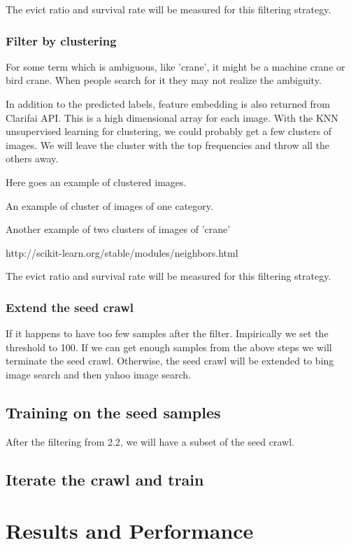 \documentclass[paper=a4, fontsize=11pt]{scrartcl}
\numberwithin{equation}{section}		%
\numberwithin{figure}{section}			%
\numberwithin{table}{section}				%
\begin{document}
\begin{multicols}{2}
The evict ratio and survival rate will be measured for this filtering strategy.

\subsubsection{Filter by clustering}
For some term which is ambiguous, like 'crane', it might be a machine crane or bird crane. When people search for it they may not realize the ambiguity.

In addition to the predicted labels, feature embedding is also returned from Clarifai API. This is a high dimensional array for each image. With the KNN unsupervised learning for clustering, we could probably get a few clusters of images. We will leave the cluster with the top frequencies and throw all the others away.

Here goes an example of clustered images. 

An example of cluster of images of one category.

Another example of two clusters of images of 'crane'

http://scikit-learn.org/stable/modules/neighbors.html

The evict ratio and survival rate will be measured for this filtering strategy.

\subsubsection{Extend the seed crawl}

If it happens to have too few samples after the filter. Impirically we set the threshold to 100. If we can get enough samples from the above steps we will terminate the seed crawl.
Otherwise, the seed crawl will be extended to bing image search and then yahoo image search.

\subsection{Training on the seed samples}
After the filtering from 2.2, we will have a subset of the seed crawl.

\subsection{Iterate the crawl and train}

\section{Results and Performance}


\end{multicols}
\end{document}
